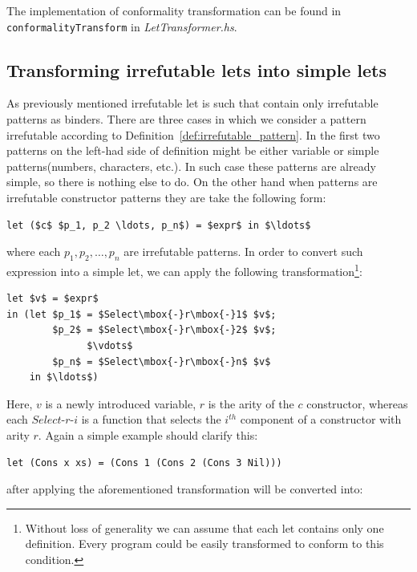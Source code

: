 \documentclass[12pt,a4paper]{report}
\begin{document}
The implementation of conformality transformation can be found in
\texttt{conformalityTransform} in \textit{LetTransformer.hs}.

\subsection{Transforming irrefutable lets into simple lets}
As previously mentioned irrefutable let is such that contain only
irrefutable patterns as binders. There are three cases in which we consider a
pattern irrefutable according to Definition~\ref{def:irrefutable_pattern}. In
the first two patterns on the left-had side of definition might be either
variable or simple patterns(numbers, characters, etc.). In such case these
patterns are already simple, so there is nothing else to do. On the other hand
when patterns are irrefutable constructor patterns they are take the following
form:

\vspace*{0.2in}
\begin{lstlisting}[style=haskell,mathescape=true]
  let ($c$ $p_1, p_2 \ldots, p_n$) = $expr$ in $\ldots$
\end{lstlisting}
where each $p_1, p_2, \ldots, p_n$ are irrefutable patterns. In order to
convert such expression into a simple let, we can apply the following
transformation\footnote{Without loss of generality we can assume that each
let contains only one definition. Every program could be easily
transformed to conform to this condition.}:

\vspace*{0.2in}
\begin{lstlisting}[style=haskell,mathescape=true]
let $v$ = $expr$
in (let $p_1$ = $Select\mbox{-}r\mbox{-}1$ $v$;
        $p_2$ = $Select\mbox{-}r\mbox{-}2$ $v$;
              $\vdots$
        $p_n$ = $Select\mbox{-}r\mbox{-}n$ $v$
    in $\ldots$)
\end{lstlisting}
Here, $v$ is a newly introduced variable, $r$ is the arity of the $c$
constructor, whereas each $Select\mbox{-}r\mbox{-}i$ is a function that selects
the $i^{th}$ component of a constructor with arity $r$. Again a simple example
should clarify this:

\vspace*{0.2in}
\begin{lstlisting}[style=haskell,mathescape=true]
let (Cons x xs) = (Cons 1 (Cons 2 (Cons 3 Nil)))
\end{lstlisting}
after applying the aforementioned transformation will be converted into:
\end{document}
